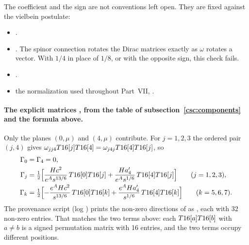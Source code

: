 The coefficient and the sign are not conventions left open. They are fixed against the vielbein
postulate:
\begin{itemize}
  \item {} .
  \item {} .
    The spinor connection rotates the Dirac matrices exactly as $\omega$ rotates a vector. With
    $1/4$ in place of $1/8$, or with the opposite sign, this check fails.
  \item {} .
  \item {} the normalization used throughout Part~VII, .
\end{itemize}

\paragraph{The explicit matrices \cfderived, from the table of
subsection~\ref{csc:components} and the formula above.} Only the planes $(0,\mu)$ and $(4,\mu)$
contribute. For $j=1,2,3$ the ordered pair $(j,4)$ gives
$\omega_{jj4}T16[j]T16[4]=\omega_{j4j}T16[4]T16[j]$, so
\begin{equation}
\begin{aligned}
  \Gamma_0&=\Gamma_4=0,\\
  \Gamma_j&=\tfrac12\Bigl[\frac{Hc^2}{e^{A}s^{13/6}}\,T16[0]T16[j]+\frac{Ha_4'}{e^{A}s^{1/6}}\,T16[4]T16[j]\Bigr]\qquad(j=1,2,3),\\
  \Gamma_k&=\tfrac12\Bigl[-\frac{e^{A}Hc^2}{s^{13/6}}\,T16[0]T16[k]+\frac{e^{A}Ha_4'}{s^{1/6}}\,T16[4]T16[k]\Bigr]\qquad(k=5,6,7).
\end{aligned}
\end{equation}
The provenance script  (log
) prints the non-zero directions of  as
, each with 32 non-zero entries. That matches the two terms above: each
$T16[a]T16[b]$ with $a\neq b$ is a signed permutation matrix with 16 entries, and the two terms
occupy different positions.

